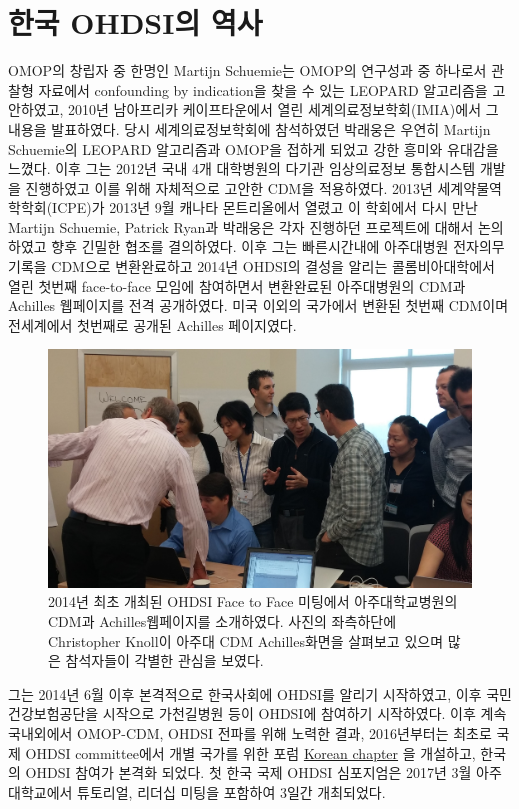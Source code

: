 \documentclass[11pt]{book}
\theoremstyle{definition}
\theoremstyle{definition}
\theoremstyle{definition}
\theoremstyle{remark}
\begin{document}
\section{한국 OHDSI의 역사}\label{-ohdsi-}

OMOP의 창립자 중 한명인 Martijn Schuemie는 OMOP의 연구성과 중 하나로서
관찰형 자료에서 confounding by indication을 찾을 수 있는 LEOPARD
알고리즘을 고안하였고, 2010년 남아프리카 케이프타운에서 열린
세계의료정보학회(IMIA)에서 그 내용을 발표하였다. 당시 세계의료정보학회에
참석하였던 박래웅은 우연히 Martijn Schuemie의 LEOPARD 알고리즘과 OMOP을
접하게 되었고 강한 흥미와 유대감을 느꼈다. 이후 그는 2012년 국내 4개
대학병원의 다기관 임상의료정보 통합시스템 개발을 진행하였고 이를 위해
자체적으로 고안한 CDM을 적용하였다. 2013년 세계약물역학학회(ICPE)가
2013년 9월 캐나타 몬트리올에서 열렸고 이 학회에서 다시 만난 Martijn
Schuemie, Patrick Ryan과 박래웅은 각자 진행하던 프로젝트에 대해서
논의하였고 향후 긴밀한 협조를 결의하였다. 이후 그는 빠른시간내에
아주대병원 전자의무기록을 CDM으로 변환완료하고 2014년 OHDSI의 결성을
알리는 콜롬비아대학에서 열린 첫번째 face-to-face 모임에 참여하면서
변환완료된 아주대병원의 CDM과 Achilles 웹페이지를 전격 공개하였다. 미국
이외의 국가에서 변환된 첫번째 CDM이며 전세계에서 첫번째로 공개된
Achilles 페이지였다.

\begin{figure}

{\centering \includegraphics[width=0.8\linewidth]{images/OhdsiCommunity/2014f2fmeeting_korea} 

}

\caption{2014년 최초 개최된 OHDSI Face to Face 미팅에서 아주대학교병원의 CDM과 Achilles웹페이지를 소개하였다. 사진의 좌측하단에 Christopher Knoll이 아주대 CDM Achilles화면을 살펴보고 있으며 많은 참석자들이 각별한 관심을 보였다.}\label{fig:OHDSIf2f2014}
\end{figure}

그는 2014년 6월 이후 본격적으로 한국사회에 OHDSI를 알리기 시작하였고,
이후 국민건강보험공단을 시작으로 가천길병원 등이 OHDSI에 참여하기
시작하였다. 이후 계속 국내외에서 OMOP-CDM, OHDSI 전파를 위해 노력한
결과, 2016년부터는 최초로 국제 OHDSI committee에서 개별 국가를 위한 포럼
\href{http://forums.ohdsi.org/c/For-collaborators-wishing-to-communicate-in-Korean}{Korean
chapter} 을 개설하고, 한국의 OHDSI 참여가 본격화 되었다. 첫 한국 국제
OHDSI 심포지엄은 2017년 3월 아주대학교에서 튜토리얼, 리더십 미팅을
포함하여 3일간 개최되었다.
\end{document}
